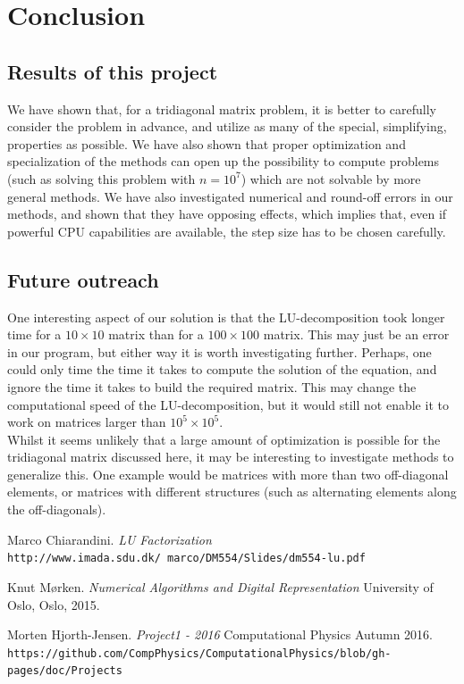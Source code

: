 \documentclass[a4paper, 10pt]{article}
\begin{document}
\section{Conclusion}
\subsection{Results of this project}
We have shown that, for a tridiagonal matrix problem, it is better to carefully consider the problem in advance, and utilize as many of the special, simplifying, properties as possible. We have also shown that proper optimization and specialization of the methods can open up the possibility to compute problems (such as solving this problem with $n=10^7$) which are not solvable by more general methods. We have also investigated numerical and round-off errors in our methods, and shown that they have opposing effects, which implies that, even if powerful CPU capabilities are available, the step size has to be chosen carefully.
\subsection{Future outreach}
One interesting aspect of our solution is that the LU-decomposition took longer time for a $10\times 10$  matrix than for a $100 \times 100$ matrix. This may just be an error in our program, but either way it is worth investigating further. Perhaps, one could only time the time it takes to compute the solution of the equation, and ignore the time it takes to build the required matrix. This may change the computational speed of the LU-decomposition, but it would still not enable it to work on matrices larger than $10^5 \times 10^5$.\\
\linebreak
 Whilst it seems unlikely that a large amount of optimization is possible for the tridiagonal matrix discussed here, it may be interesting to investigate methods to generalize this. One example would be matrices with more than two off-diagonal elements, or matrices with different structures (such as alternating elements along the off-diagonals). 

\begin{thebibliography}{9}
Marco Chiarandini.
\textit{LU Factorization}
\\\texttt{http://www.imada.sdu.dk/~marco/DM554/Slides/dm554-lu.pdf}

Knut Mørken.
\textit{Numerical Algorithms and Digital Representation}
University of Oslo, Oslo, 2015.

Morten Hjorth-Jensen.
\textit{Project1 - 2016}
Computational Physics Autumn 2016.
\\\texttt{https://github.com/CompPhysics/ComputationalPhysics/blob/gh-pages/doc/Projects}


\end{thebibliography}
\end{document}
